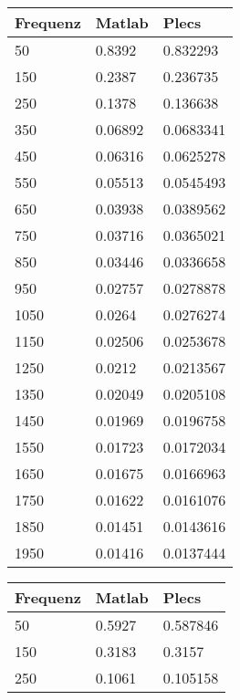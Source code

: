 \begin{appendix}
\begin{minipage}{0.49\textwidth}
	\centering
	\begin{tabular}{|l|l|l|}
		\hline
		Frequenz & Matlab  & Plecs     \\ \hline
		50       & 0.8392  & 0.832293  \\ \hline
		150      & 0.2387  & 0.236735  \\ \hline
		250      & 0.1378  & 0.136638  \\ \hline
		350      & 0.06892 & 0.0683341 \\ \hline
		450      & 0.06316 & 0.0625278 \\ \hline
		550      & 0.05513 & 0.0545493 \\ \hline
		650      & 0.03938 & 0.0389562 \\ \hline
		750      & 0.03716 & 0.0365021 \\ \hline
		850      & 0.03446 & 0.0336658 \\ \hline
		950      & 0.02757 & 0.0278878 \\ \hline
		1050     & 0.0264  & 0.0276274 \\ \hline
		1150     & 0.02506 & 0.0253678 \\ \hline
		1250     & 0.0212  & 0.0213567 \\ \hline
		1350     & 0.02049 & 0.0205108 \\ \hline
		1450     & 0.01969 & 0.0196758 \\ \hline
		1550     & 0.01723 & 0.0172034 \\ \hline
		1650     & 0.01675 & 0.0166963 \\ \hline
		1750     & 0.01622 & 0.0161076 \\ \hline
		1850     & 0.01451 & 0.0143616 \\ \hline
		1950     & 0.01416 & 0.0137444 \\ \hline
	\end{tabular}
\label{tab:Phas_60_Vergleich}
\end{minipage}
%
\begin{minipage}{0.49\textwidth}
	\begin{tabular}{|l|l|l|}
		\hline
		Frequenz & Matlab  & Plecs     \\ \hline
		50       & 0.5927  & 0.587846  \\ \hline
		150      & 0.3183  & 0.3157    \\ \hline
		250      & 0.1061  & 0.105158  \\ \hline

\end{tabular}
\end{minipage}
\end{appendix}
